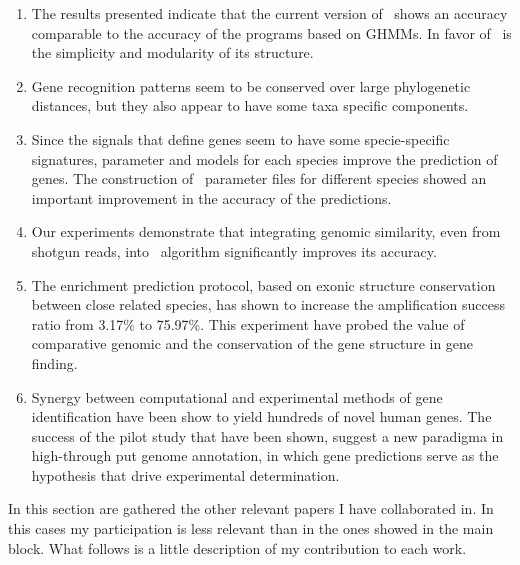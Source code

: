 \begin{enumerate}


\item The results presented indicate that the current version of 
\geneid\ shows an accuracy comparable to the accuracy of the programs 
based on GHMMs. In favor of \geneid\ is the simplicity and modularity
of its structure.

\item Gene recognition patterns seem to be conserved over large 
phylogenetic distances, but they also appear to have some taxa
specific components.

\item Since the signals that define genes seem to have some 
specie-specific signatures, parameter and models for each species
improve the prediction of genes. The construction of \geneid\
parameter files for different species showed an important improvement in
the accuracy of the predictions.

\item Our experiments demonstrate that integrating genomic similarity, 
even from shotgun reads, into \geneid\ algorithm significantly
improves its accuracy.

\item The enrichment prediction protocol, based on exonic structure 
conservation between close related species, has shown to  increase the
amplification success ratio from 3.17\% to 75.97\%. This experiment
have probed  the value of comparative genomic and the conservation of
the gene structure in gene finding.

\item  Synergy between computational and experimental methods of gene
identification have been show to yield hundreds of novel human
genes. The success of the pilot study that have been shown, suggest a
new paradigma in high-through put genome annotation, in which gene
predictions serve as the hypothesis that drive experimental
determination.


\end{enumerate}

\clearemptydoublepage



In this section are gathered the other relevant papers I have
collaborated in. In this cases my participation is less relevant than
in the ones showed in the main block. What follows is a little
description of my contribution to each work.


